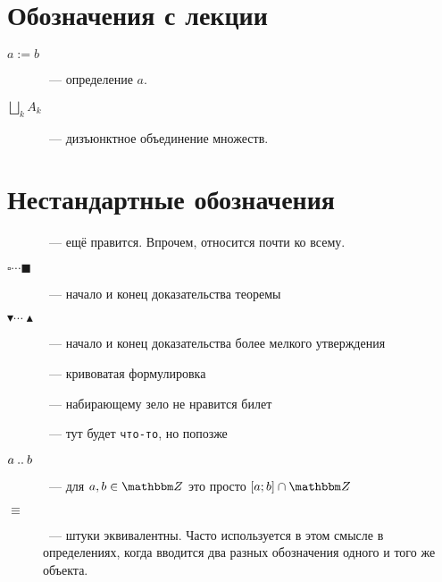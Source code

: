 \documentclass[12pt]{../../notes}
\begin{document}
\section*{Обозначения с лекции}
\begin{description}
  \item[$a:= b$]~--- определение $a$.
  \item[$\displaystyle \bigsqcup_k A_k$]~--- дизъюнктное объединение множеств.
\end{description}

\section*{Нестандартные обозначения}

\begin{description}
  \item[\underdev]~--- ещё правится. Впрочем, относится почти ко всему.
  \item[$\square\cdots\blacksquare$]~--- начало и конец доказательства теоремы
  \item[$\blacktriangledown\cdots\blacktriangle$]~--- начало и конец доказательства более мелкого 
    утверждения
  \item[\sour]~--- кривоватая формулировка
  \item[\flame]~--- набирающему зело не нравится билет
  \item[]~--- тут будет \texttt{что-то}, но попозже
  \item[$a\mathbin{..} b$]~--- для $a,b \in \Z$ это просто $[a;b]\cap \Z$
  \item[$\equiv$]~--- штуки эквивалентны. Часто используется в этом смысле в
    определениях, когда вводится два разных обозначения одного и того же
    объекта.
\end{description}
\end{document}
